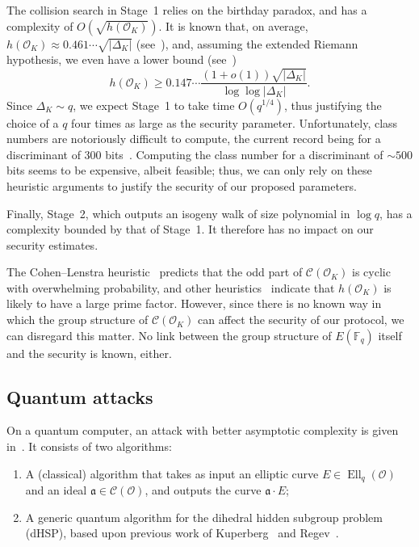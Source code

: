 \documentclass{llncs}
\newcommand{\F}{\mathbb{F}}
\newcommand{\Cl}{\mathcal{C}}
\renewcommand{\O}{\mathcal{O}}
\renewcommand{\frak}{\mathfrak}
\DeclareMathOperator{\Ell}{Ell}
\begin{document}
The collision search in Stage~1 relies on the birthday paradox, and
has a complexity of $O(\sqrt{h(\O_K)})$.
It is known that, on average,
$h(\O_K)≈0.461\cdots\sqrt{|Δ_K|}$ (see~\cite[5.10]{Cohen1993}), and,
assuming the extended Riemann hypothesis, we even have a lower bound
(see~\cite{littlewood1928class})
\[h(\O_K) ≥ 0.147\cdots\frac{(1+o(1))\sqrt{|Δ_K|}}{\log\log|Δ_K|}.\]
Since $Δ_K\sim q$, we expect Stage~1 to take time $O(q^{1/4})$,
thus justifying the choice of a $q$ four times as large as the
security parameter.  Unfortunately, class numbers are notoriously
difficult to compute, the current record being
for a discriminant of 300 bits~\cite{10.1007/978-3-642-14081-5_15}.
Computing the class
number for a discriminant of ${\sim 500}$ bits seems to be expensive,
albeit feasible; thus, we can only rely on these heuristic arguments
to justify the security of our proposed parameters.

Finally, Stage~2,
which outputs an isogeny walk of size polynomial in $\log q$,
has a complexity bounded by that of Stage~1.
It therefore has no impact on our security estimates.

\begin{remark}
  The Cohen--Lenstra heuristic~\cite{10.1007/BFb0099440} predicts that
  the odd part of $\Cl(\O_K)$ is cyclic with overwhelming
  probability, and other heuristics~\cite{10.1007/3-540-44448-3_18}
  indicate that $h(\O_K)$ is likely to have a large prime factor.
  However, since there is no known way in which the group structure of
  $\Cl(\O_K)$ can affect the security of our protocol, we can 
  disregard this matter. No link between the group structure
	of $E(\F_q)$ itself and the security is known, either.
\end{remark}

\subsection{Quantum attacks}
\label{sec:quantum-attacks}

On a quantum computer, an attack with better asymptotic complexity is
given in~\cite{childs2014constructing}. It consists of two algorithms:
\begin{enumerate}
\item A (classical) algorithm that takes as input an elliptic curve
  $E∈\Ell_q(\O)$ and an ideal $\frak a∈\Cl(\O)$, and outputs the curve
  $\frak a·E$;
\item A generic quantum algorithm for the dihedral hidden subgroup
  problem (dHSP), based upon previous work of Kuperberg~\cite{Kup,todo} and
  Regev~\cite{regev04}.
\end{enumerate}
\end{document}
